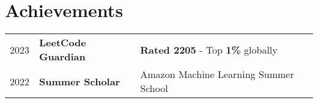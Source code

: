 \documentclass[]{deedy-resume-openfont}
\begin{document}
\begin{minipage}[t]{0.66\textwidth}
\section{Achievements} 
\begin{tabular}{rll}
2023         & \textbf{LeetCode Guardian} & \textbf{Rated 2205} - Top \textbf{1\%} globally \\
2022         & \textbf{Summer Scholar}    & Amazon Machine Learning Summer School\\
\end{tabular}
\sectionsep




\end{minipage}
\end{document}
